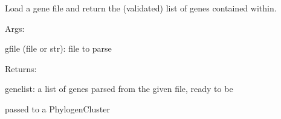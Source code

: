 \documentclass[letterpaper,10pt,english]{sphinxmanual}
\begin{document}
\begin{fulllineitems}
\label{doctree/soprano.analyse.phylogen.genes:soprano.analyse.phylogen.genes.load_genefile}
Load a gene file and return the (validated) list of genes contained
within.

\begin{DUlineblock}{0em}
\item[] Args:
\item[]
\begin{DUlineblock}{\DUlineblockindent}
\item[] gfile (file or str): file to parse
\end{DUlineblock}
\end{DUlineblock}

\begin{DUlineblock}{0em}
\item[] Returns:
\item[]
\begin{DUlineblock}{\DUlineblockindent}
\item[] genelist: a list of genes parsed from the given file, ready to be
\item[]
\begin{DUlineblock}{\DUlineblockindent}
\item[] passed to a PhylogenCluster
\end{DUlineblock}
\end{DUlineblock}
\end{DUlineblock}

\end{fulllineitems}


\begin{fulllineitems}
\label{doctree/soprano.analyse.phylogen.genes:soprano.analyse.phylogen.genes.parsegene_bond_order}
\end{fulllineitems}


\begin{fulllineitems}
\label{doctree/soprano.analyse.phylogen.genes:soprano.analyse.phylogen.genes.parsegene_coord_histogram}
\end{fulllineitems}
\end{document}
